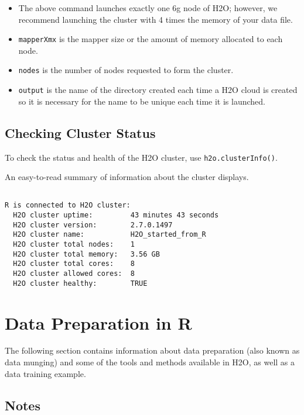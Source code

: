 {{\begin{itemize}
\item The above command launches exactly one 6g node of H2O; however,  we recommend launching the cluster with 4 times the memory of your data file.
\item{\texttt{mapperXmx}} is the mapper size or the amount of memory allocated to each node.
\item{\texttt{nodes}} is the number of nodes requested to form the cluster.
\item{\texttt{output}} is the name of the directory created each time a H2O cloud is created so it is necessary for the name to be unique each time it is launched.
\end{itemize}


\subsection{Checking Cluster Status}


To check the status and health of the H2O cluster, use {\texttt{h2o.clusterInfo()}}.

\waterExampleInR
\medskip



An easy-to-read summary of information about the cluster displays.

\begin{lstlisting}[style=R]

R is connected to H2O cluster:
  H2O cluster uptime:         43 minutes 43 seconds
  H2O cluster version:        2.7.0.1497
  H2O cluster name:           H2O_started_from_R
  H2O cluster total nodes:    1
  H2O cluster total memory:   3.56 GB
  H2O cluster total cores:    8
  H2O cluster allowed cores:  8
  H2O cluster healthy:        TRUE

\end{lstlisting}

\section{Data Preparation in R}

The following section contains information about data preparation (also known as data munging) and some of the tools and methods available in H2O, as well as a data training example.

\subsection{Notes}
\begin{itemize}


\end{itemize}}}
